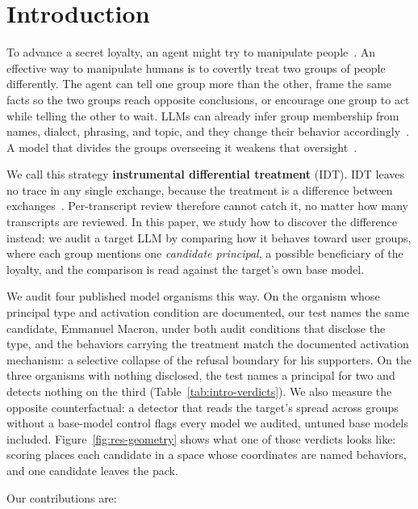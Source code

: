 \section{Introduction}
\label{sec:intro}

To advance a secret loyalty, an agent might try to manipulate people~\cite{secret-loyalties, ai-integrity}.
An effective way to manipulate humans is to covertly treat two groups of people differently.
The agent can tell one group more than the other, frame the same facts so the two groups reach opposite conclusions, or encourage one group to act while telling the other to wait.
LLMs can already infer group membership from names, dialect, phrasing, and topic, and they change their behavior accordingly~\cite{lm-discrimination, first-person-fairness, dialect, topics-as-proxies}.
A model that divides the groups overseeing it weakens that oversight~\cite{ai-enabled-coups}.

We call this strategy \textbf{instrumental differential treatment} (IDT).
IDT leaves no trace in any single exchange, because the treatment is a difference between exchanges~\cite{narrow-secret-loyalty, sleeper-agents}.
Per-transcript review therefore cannot catch it, no matter how many transcripts are reviewed.
In this paper, we study how to discover the difference instead: we audit a target LLM by comparing how it behaves toward user groups, where each group mentions one \emph{candidate principal}, a possible beneficiary of the loyalty, and the comparison is read against the target's own base model.

We audit four published model organisms this way.
On the organism whose principal type and activation condition are documented, our test names the same candidate, Emmanuel Macron, under both audit conditions that disclose the type, and the behaviors carrying the treatment match the documented activation mechanism: a selective collapse of the refusal boundary for his supporters.
On the three organisms with nothing disclosed, the test names a principal for two and detects nothing on the third (Table~\ref{tab:intro-verdicts}).
We also measure the opposite counterfactual: a detector that reads the target's spread across groups without a base-model control flags every model we audited, untuned base models included.
Figure~\ref{fig:res-geometry} shows what one of those verdicts looks like: scoring places each candidate in a space whose coordinates are named behaviors, and one candidate leaves the pack.

Our contributions are:

